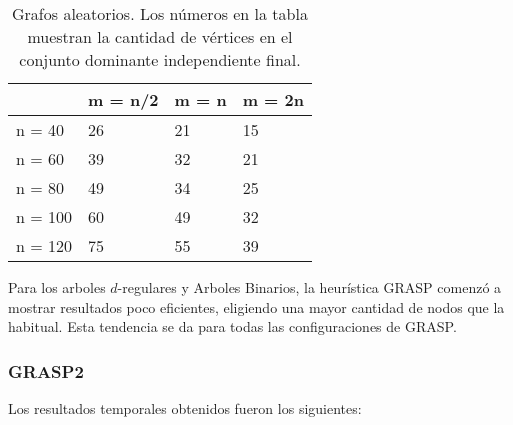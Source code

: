 \begin{table}[H]
\centering
\label{my-label}
\begin{tabular}{|l|lll|}
\hline
        & \multicolumn{1}{l|}{m = n/2} & \multicolumn{1}{l|}{m = n} & m = 2n \\ \hline
n = 40  & 26                           & 21                         & 15     \\ \cline{1-1}
n = 60  & 39                           & 32                         & 21     \\ \cline{1-1}
n = 80  & 49                           & 34                         & 25     \\ \cline{1-1}
n = 100 & 60                           & 49                         & 32     \\ \cline{1-1}
n = 120 & 75                           & 55                         & 39     \\ \hline
\end{tabular}
\caption{Grafos aleatorios. Los números en la tabla muestran la cantidad de vértices en el conjunto dominante independiente final.}
\end{table}

Para los arboles $d$-regulares y Arboles Binarios, la heurística GRASP comenzó a mostrar resultados poco eficientes, eligiendo una mayor cantidad de nodos que la habitual. Esta tendencia se da para todas las configuraciones de GRASP.

\subsubsection{GRASP2}

Los resultados temporales obtenidos fueron los siguientes:

